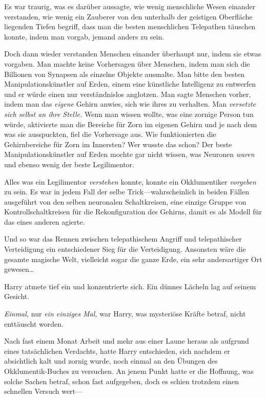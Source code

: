 {Es war traurig, was es darüber aussagte, wie wenig menschliche Wesen einander verstanden, wie wenig ein Zauberer von den unterhalb der geistigen Oberfläche liegenden Tiefen begriff, dass man die besten menschlichen Telepathen täuschen konnte, indem man vorgab, jemand anders zu sein.

Doch dann wieder verstanden Menschen einander überhaupt nur, indem sie etwas vorgaben. Man machte keine Vorhersagen über Menschen, indem man sich die Billionen von Synapsen als einzelne Objekte ausmalte. Man bitte den besten Manipulationskünstler auf Erden, einem eine künstliche Intelligenz zu entwerfen und er würde einen nur verständnislos anglotzen. Man sagte Menschen vorher, indem man das \emph{eigene} Gehirn anwies, sich wie ihres zu verhalten. Man \emph{versetzte sich selbst an ihre Stelle.} Wenn man wissen wollte, was eine zornige Person tun würde, aktivierte man die Bereiche für Zorn im eigenen Gehirn und je nach dem was sie ausspuckten, fiel die Vorhersage aus. Wie funktionierten die Gehirnbereiche für Zorn im Innersten? Wer wusste das schon? Der beste Manipulationskünstler auf Erden mochte gar nicht wissen, was Neuronen \emph{waren} und ebenso wenig der beste Legilimentor.

Alles was ein Legilimentor \emph{verstehen} konnte, konnte ein Okklumentiker \emph{vorgeben} zu sein. Es war in jedem Fall der selbe Trick—wahrscheinlich in beiden Fällen ausgeführt von den selben neuronalen Schaltkreisen, eine einzige Gruppe von Kontrollschaltkreisen für die Rekonfiguration des Gehirns, damit es als Modell für das eines anderen agierte.

Und so war das Rennen zwischen telepathischem Angriff und telepathischer Verteidigung ein entschiedener Sieg für die Verteidigung. Ansonsten wäre die gesamte magische Welt, vielleicht sogar die ganze Erde, ein sehr andersartiger Ort gewesen…

Harry atmete tief ein und konzentrierte sich. Ein dünnes Lächeln lag auf seinem Gesicht.

\emph{Einmal,} nur \emph{ein einziges Mal,} war Harry, was mysteriöse Kräfte betraf, nicht enttäuscht worden.

Nach fast einem Monat Arbeit und mehr aus einer Laune heraus als aufgrund eines tatsächlichen Verdachts, hatte Harry entschieden, sich nachdem er absichtlich kalt und zornig wurde, noch einmal an den Übungen des Okklumentik-Buches zu versuchen. An jenem Punkt hatte er die Hoffnung, was solche Sachen betraf, schon fast aufgegeben, doch es schien trotzdem einen schnellen Versuch wert—

}
